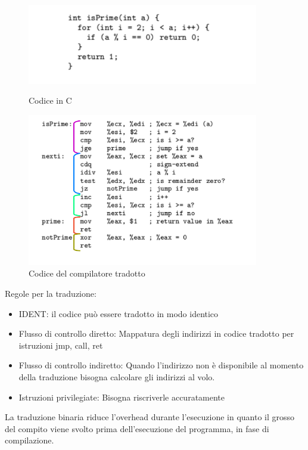\documentclass{article}
\begin{document}
		\begin{figure}[ht]
		    \centering
		    \begin{minipage}{0.5\textwidth}
		        \centering
		        \includegraphics[width=0.9\textwidth]{SAC_B1_binaryTranslation01.png} %
		        \caption{Codice in C}
		    \end{minipage}\hfill
		    \begin{minipage}{0.5\textwidth}
		        \centering
		        \includegraphics[width=0.9\textwidth]{SAC_B1_binaryTranslation02.png} %
		        \caption{Codice del compilatore tradotto}
		    \end{minipage}
		\end{figure}
		\newpage
		Regole per la traduzione:
		\begin{itemize}
		    \item IDENT: il codice può essere tradotto in modo identico
		    \item Flusso di controllo diretto: Mappatura degli indirizzi in codice tradotto per istruzioni jmp, call, ret
		    \item Flusso di controllo indiretto: Quando l'indirizzo non è disponibile al momento della traduzione bisogna calcolare gli indirizzi al volo.
		    \item Istruzioni privilegiate: Bisogna riscriverle accuratamente
		\end{itemize}
		La traduzione binaria riduce l'overhead durante l'esecuzione in quanto il grosso del compito viene svolto prima dell'esecuzione del programma, in fase di compilazione. 
		
\end{document}
